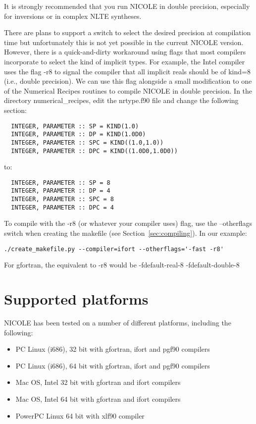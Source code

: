 It is strongly recommended that you run NICOLE in double precision,
especially for inversions or in complex NLTE syntheses.

There are plans to support a switch to select the desired precision at
compilation time but unfortunately this is not yet possible in the
current NICOLE version. However, there is a quick-and-dirty workaround
using flags that most compilers incorporate to select the kind of
implicit types. For example, the Intel compiler uses the flag -r8 to
signal the compiler that all implicit reals should be of kind=8 (i.e.,
double precision). We can use this flag alongside a small modification
to one of the Numerical Recipes routines to compile NICOLE in double
precision.  In the directory numerical\_recipes, edit the nrtype.f90
file and change the following section:
\begin{verbatim}
  INTEGER, PARAMETER :: SP = KIND(1.0)
  INTEGER, PARAMETER :: DP = KIND(1.0D0)
  INTEGER, PARAMETER :: SPC = KIND((1.0,1.0))
  INTEGER, PARAMETER :: DPC = KIND((1.0D0,1.0D0))
\end{verbatim}
to:
\begin{verbatim}
  INTEGER, PARAMETER :: SP = 8
  INTEGER, PARAMETER :: DP = 4
  INTEGER, PARAMETER :: SPC = 8
  INTEGER, PARAMETER :: DPC = 4
\end{verbatim}

To compile with the -r8 (or whatever your compiler uses) flag, use the
--otherflags switch when creating the makefile (see 
Section~\ref{sec:compiling}). In our example:
\begin{verbatim}
./create_makefile.py --compiler=ifort --otherflags='-fast -r8'
\end{verbatim}
For gfortran, the equivalent to -r8 would be -fdefault-real-8 -fdefault-double-8 

\section{Supported platforms}

NICOLE has been tested on a number of different platforms, including
the following:

\begin{itemize}
\item PC Linux (i686), 32 bit with gfortran, ifort and pgf90 compilers
\item PC Linux (i686), 64 bit with gfortran, ifort and pgf90 compilers
\item Mac OS, Intel 32 bit with gfortran and ifort compilers
\item Mac OS, Intel 64 bit with gfortran and ifort compilers
\item PowerPC Linux 64 bit with xlf90 compiler
\end{itemize}

